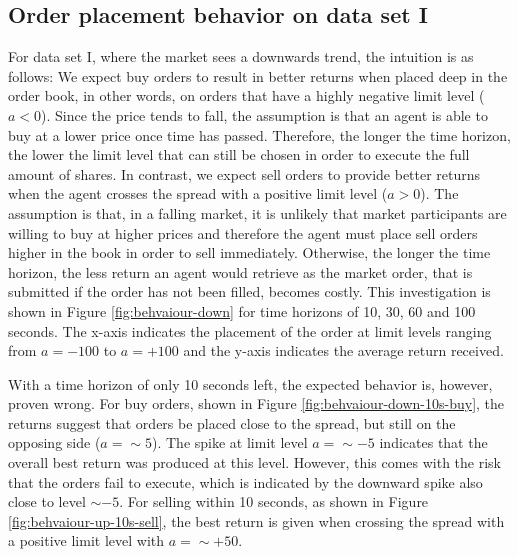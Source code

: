 \subsection{Order placement behavior on data set I}
For data set I, where the market sees a downwards trend, the intuition is as follows:
We expect buy orders to result in better returns when placed deep in the order book, in other words, on orders that have a highly negative limit level ($a<0$).
Since the price tends to fall, the assumption is that an agent is able to buy at a lower price once time has passed.
Therefore, the longer the time horizon, the lower the limit level that can still be chosen in order to execute the full amount of shares.
In contrast,  we expect sell orders to provide better returns when the agent crosses the spread with a positive limit level ($a>0$).
The assumption is that, in a falling market, it is unlikely that market participants are willing to buy at higher prices and therefore the agent must place sell orders higher in the book in order to sell immediately.
Otherwise, the longer the time horizon, the less return an agent would retrieve as the market order, that is submitted if the order has not been filled, becomes costly.
This investigation is shown in Figure \ref{fig:behvaiour-down} for time horizons of 10, 30, 60 and 100 seconds.
The x-axis indicates the placement of the order at limit levels ranging from $a=-100$ to $a=+100$ and the y-axis indicates the average return received.

With a time horizon of only 10 seconds left, the expected behavior is, however, proven wrong.
For buy orders, shown in Figure \ref{fig:behvaiour-down-10s-buy}, the returns suggest that orders be placed close to the spread, but still on the opposing side ($a=\sim{5}$).
The spike at limit level $a=\sim{-5}$ indicates that the overall best return was produced at this level. However, this comes with the risk that the orders fail to execute, which is indicated by the downward spike also close to level $\sim{-5}$.
For selling within 10 seconds, as shown in Figure \ref{fig:behvaiour-up-10s-sell}, the best return is given when crossing the spread with a positive limit level with $a=\sim{+50}$.

